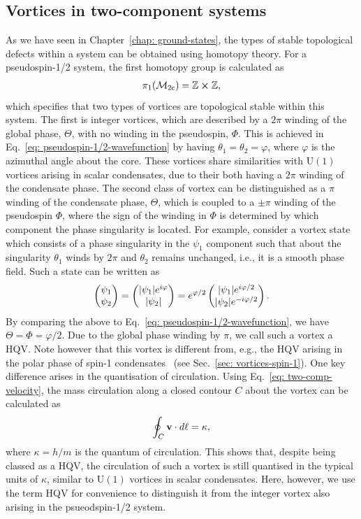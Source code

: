 \subsection{Vortices in two-component systems}
As we have seen in Chapter~\ref{chap: ground-states}, the types of stable
topological defects within a system can be obtained using homotopy theory.
For a pseudospin-1/2 system, the first homotopy group is calculated
as~\cite{Eto2011}
\begin{align}
    \pi_1(\mathcal{M}_\text{2c}) = \mathbb{Z} \cross \mathbb{Z},
\end{align}
which specifies that two types of vortices are topological stable within this
system.
The first is integer vortices, which are described by a \(2\pi \) winding of
the global phase, \(\Theta \), with no winding in the pseudospin, \(\Phi \).
This is achieved in Eq.~\eqref{eq: pseudospin-1/2-wavefunction} by having
\(\theta_1=\theta_2=\varphi \), where \(\varphi \) is the azimuthal angle
about the core.
These vortices share similarities with \(\text{U}(1)\) vortices arising in
scalar condensates, due to their both having a \(2\pi \) winding of the
condensate phase.
The second class of vortex can be distinguished as a \(\pi \) winding of the
condensate phase, \(\Theta \), which is coupled to a \(\pm\pi \) winding of the
pseudospin \(\Phi \), where the sign of the winding in \(\Phi \) is determined
by which component the phase singularity is located.
For example, consider a vortex state which consists of a phase singularity in
the \(\psi_1 \) component such that about the singularity \( \theta_1 \) winds
by \( 2\pi \) and \( \theta_2 \) remains unchanged, i.e., it is a smooth phase
field.
Such a state can be written as
\begin{equation}
    \begin{pmatrix}\psi_1\\\psi_2\end{pmatrix}
    = \begin{pmatrix}|\psi_1|e^{i\varphi}\\|\psi_2|\end{pmatrix}
    = e^{\varphi/2}\begin{pmatrix}|\psi_1|e^{i\varphi/2}\\|\psi_2|e^{-i\varphi/2}\end{pmatrix}.
\end{equation}
By comparing the above to Eq.~\eqref{eq: pseudospin-1/2-wavefunction}, we have
\( \Theta=\Phi=\varphi/2 \).
Due to the global phase winding by \(\pi \), we call such a vortex a HQV\@.
Note however that this vortex is different from, e.g., the HQV arising in the
polar phase of spin-1 condensates~\cite{Leonhardt2000, Seo2015} (see
Sec.~\ref{sec: vortices-spin-1}).
One key difference arises in the quantisation of circulation.
Using Eq.~\eqref{eq: two-comp-velocity}, the mass circulation along a closed
contour \(C\) about the vortex can be calculated as
\begin{equation}
    \oint_C\vb{v}\cdot d\vb{\ell} = \kappa,
\end{equation}
where \(\kappa=h/m\) is the quantum of circulation.
This shows that, despite being classed as a HQV, the circulation of such a
vortex is still quantised in the typical units of \(\kappa \), similar to
\(\text{U}(1)\) vortices in scalar condensates.
Here, however, we use the term HQV for convenience to distinguish it from the
integer vortex also arising in the psueodspin-1/2 system.

